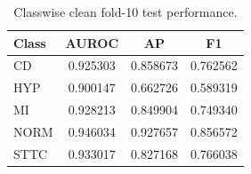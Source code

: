 \begin{table}[t]
\centering
\caption{Classwise clean fold-10 test performance.}
\label{tab:classwise}
\begin{tabular}{lccc}
\toprule
Class & AUROC & AP & F1 \\
\midrule
CD & 0.925303 & 0.858673 & 0.762562 \\
HYP & 0.900147 & 0.662726 & 0.589319 \\
MI & 0.928213 & 0.849904 & 0.749340 \\
NORM & 0.946034 & 0.927657 & 0.856572 \\
STTC & 0.933017 & 0.827168 & 0.766038 \\
\bottomrule
\end{tabular}
\end{table}
